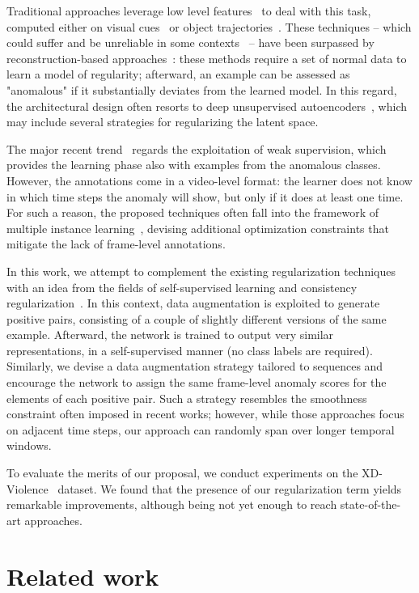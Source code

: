 \documentclass[runningheads]{llncs}
\begin{document}
Traditional approaches leverage low level features~\cite{dalal2005histograms} to deal with this task, computed either on visual cues~\cite{benezeth2009abnormal,kim2009observe} or object trajectories~\cite{calderara2011detecting, morris2011trajectory}. These techniques -- which could suffer and be unreliable in some contexts~\cite{hu2016video, medel2016anomaly} -- have been surpassed by reconstruction-based approaches~\cite{hasan2016learning}: these methods require a set of normal data to learn a model of regularity; afterward, an example can be assessed as "anomalous" if it substantially deviates from the learned model. In this regard, the architectural design often resorts to deep unsupervised autoencoders~\cite{zhu2019motion, wang2021robust}, which may include several strategies for regularizing the latent space.

The major recent trend~\cite{sultani2018real} regards the exploitation of weak supervision, which provides the learning phase also with examples from the anomalous classes. However, the annotations come in a video-level format: the learner does not know in which time steps the anomaly will show, but only if it does at least one time. For such a reason, the proposed techniques often fall into the framework of multiple instance learning~\cite{tian2021weakly, wu2020not, feng2021mist}, devising additional optimization constraints that mitigate the lack of frame-level annotations.

In this work, we attempt to complement the existing regularization techniques with an idea from the fields of self-supervised learning and consistency regularization~\cite{sohn2020fixmatch, xie2020unsupervised,chen2020simple,boschini2021continual}. In this context, data augmentation is exploited to generate positive pairs, consisting of a couple of slightly different versions of the same example. Afterward, the network is trained to output very similar representations, in a self-supervised manner (no class labels are required). Similarly, we devise a data augmentation strategy tailored to sequences and encourage the network to assign the same frame-level anomaly scores for the elements of each positive pair. Such a strategy resembles the smoothness constraint often imposed in recent works; however, while those approaches focus on adjacent time steps, our approach can randomly span over longer temporal windows.

To evaluate the merits of our proposal, we conduct experiments on the XD-Violence~\cite{wu2020not} dataset. We found that the presence of our regularization term yields remarkable improvements, although being not yet enough to reach state-of-the-art approaches. \section{Related work}
\end{document}
